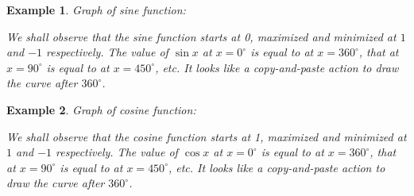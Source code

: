\documentclass[12pt]{article}
\newtheorem*{example}{Example}
\begin{document}
    \begin{example}
        Graph of sine function:

        \begin{center}
        \end{center}

        We shall observe that the sine function starts at 0, maximized and minimized at $1$ and $-1$ respectively. The value of $\sin{x}$ at $x=0^\circ$ is equal to at $x=360^\circ$, that at $x=90^\circ$ is equal to at $x=450^\circ$, etc. It looks like a copy-and-paste action to draw the curve after $360^\circ$.
    \end{example}

    \begin{example}
        Graph of cosine function:

        \begin{center}
        \end{center}

        We shall observe that the cosine function starts at 1, maximized and minimized at $1$ and $-1$ respectively. The value of $\cos{x}$ at $x=0^\circ$ is equal to at $x=360^\circ$, that at $x=90^\circ$ is equal to at $x=450^\circ$, etc. It looks like a copy-and-paste action to draw the curve after $360^\circ$.
    \end{example}
\end{document}
